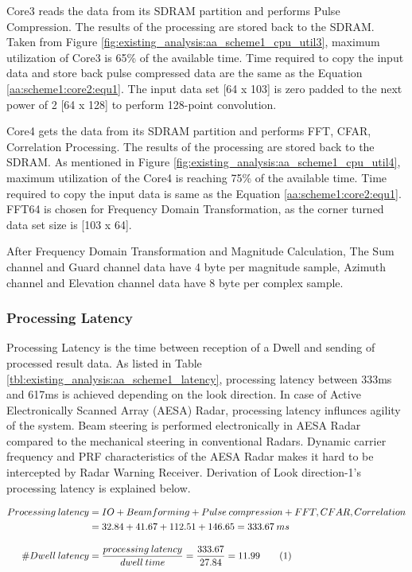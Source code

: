Core3 reads the data from its SDRAM partition and performs Pulse Compression. The results of the processing are stored back to the SDRAM. Taken from Figure \ref{fig:existing_analysis:aa_scheme1_cpu_util3}, maximum utilization of Core3 is 65\% of the available time. Time required to copy the input data and store back pulse compressed data are the same as the Equation \ref{aa:scheme1:core2:equ1}. The input data set [64 x 103] is zero padded to the next power of 2 [64 x 128] to perform 128-point convolution.


\FloatBarrier
Core4 gets the data from its SDRAM partition and performs FFT, CFAR, Correlation Processing. The results of the processing are stored back to the SDRAM. As mentioned in Figure \ref{fig:existing_analysis:aa_scheme1_cpu_util4}, maximum utilization of the Core4 is reaching 75\% of the available time.  Time required to copy the input data is same as the Equation \ref{aa:scheme1:core2:equ1}. FFT64 is chosen for Frequency Domain Transformation, as the corner turned data set size is [103 x 64].

After Frequency Domain Transformation and Magnitude Calculation, The Sum channel and Guard channel data have 4 byte per magnitude sample, Azimuth channel and Elevation channel data have 8 byte per complex sample.




\subsubsection{Processing Latency}
\label{sss:scheme1:latency}
Processing Latency is the time between reception of a Dwell and sending of processed result data. As listed in Table \ref{tbl:existing_analysis:aa_scheme1_latency}, processing latency between 333ms and 617ms is achieved depending on the look direction. In case of Active Electronically Scanned Array (AESA) Radar, processing latency influnces agility of the system. Beam steering is performed electronically in AESA Radar compared to the mechanical steering in conventional Radars. Dynamic carrier frequency and PRF characteristics of the AESA Radar makes it hard to be intercepted by Radar Warning Receiver. Derivation of Look direction-1's processing latency is explained below. 

\begin{align*}
	\label{aa:scheme1:latency}
		Processing \: latency &= IO + Beamforming + Pulse \: compression  + FFT,CFAR,Correlation \\
		&= 32.84 + 41.67 + 112.51 + 146.65 = 333.67 \: ms \\[0.3cm]
		\#Dwell \: latency &= \frac{processing \: latency}{dwell \: time} = \frac{333.67}{27.84} = 11.99 \stepcounter{equation}\tag{\theequation}
\end{align*}

